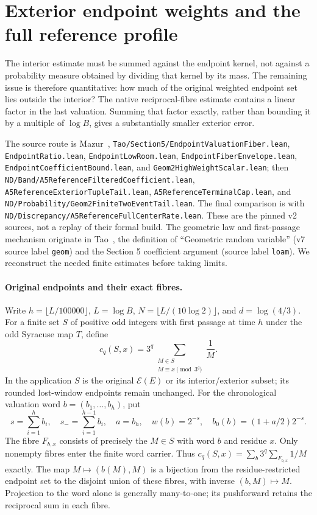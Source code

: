 \documentclass[11pt]{article}
\theoremstyle{remark}\newtheorem{remark}[proposition]{Remark}
\begin{document}
\section{Exterior endpoint weights and the full reference profile}
\label{sec:mazur-exterior-assembly}

The interior estimate must be summed against the endpoint kernel, not
against a probability measure obtained by dividing that kernel by its
mass. The remaining issue is therefore quantitative: how much of the
original weighted endpoint set lies outside the interior? The native
reciprocal-fibre estimate contains a linear factor in the last valuation.
Summing that factor exactly, rather than bounding it by a multiple of
$\log B$, gives a substantially smaller exterior error.

The source route is Mazur~\cite{Mazur2026v2},
\texttt{Tao/Section5/EndpointValuationFiber.lean},
\texttt{EndpointRatio.lean}, \texttt{EndpointLowRoom.lean},
\texttt{EndpointFiberEnvelope.lean}, \texttt{EndpointCoefficientBound.lean},
and \texttt{Geom2HighWeightScalar.lean};
then \texttt{ND/Band/A5ReferenceFilteredCoefficient.lean},
\texttt{A5ReferenceExteriorTupleTail.lean},
\texttt{A5ReferenceTerminalCap.lean}, and
\texttt{ND/Probability/Geom2FiniteTwoEventTail.lean}.
The final comparison is with
\texttt{ND/Discrepancy/A5ReferenceFullCenterRate.lean}.
These are the pinned v2 sources, not a replay of their formal build.
The geometric law and first-passage mechanism originate in
Tao~\cite{Tao7}, the definition of ``Geometric random variable''
(v7 source label \texttt{geom}) and the Section 5 coefficient argument
(source label \texttt{loam}).
We reconstruct the needed finite estimates before taking limits.

\paragraph{Original endpoints and their exact fibres.}
Write $h=\lfloor L/100000\rfloor$, $L=\log B$,
$N=\lfloor L/(10\log2)\rfloor$, and $d=\log(4/3)$.
For a finite set $S$ of positive odd integers with first passage at time
$h$ under the odd Syracuse map $T$, define
\[
 c_q(S,x)=3^q\sum_{\substack{M\in S\\M\equiv x\pmod{3^q}}}\frac1M .
\]
In the application $S$ is the original $\mathcal E(E)$ or its
interior/exterior subset; its rounded lost-window endpoints remain
unchanged. For the chronological valuation word
$b=(b_1,\ldots,b_h)$, put
\[
 s=\sum_{i=1}^h b_i,\quad s_-=\sum_{i=1}^{h-1}b_i,\quad a=b_h,
 \quad w(b)=2^{-s},\quad b_0(b)=(1+a/2)2^{-s}.
\]
The fibre $F_{b,x}$ consists of precisely the $M\in S$ with word $b$
and residue $x$. Only nonempty fibres enter the finite word carrier.
Thus $c_q(S,x)=\sum_b3^q\sum_{F_{b,x}}1/M$ exactly.
The map $M\mapsto(b(M),M)$ is a bijection from the residue-restricted
endpoint set to the disjoint union of these fibres, with inverse
$(b,M)\mapsto M$. Projection to the word alone is generally many-to-one;
its pushforward retains the reciprocal sum in each fibre.
\end{document}
